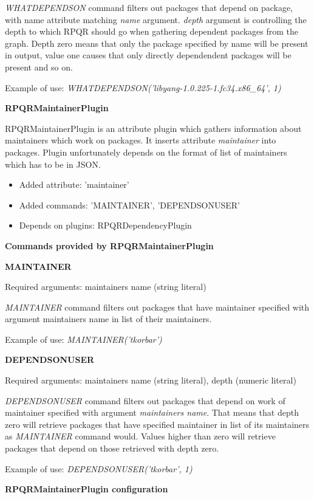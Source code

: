 \textit{WHATDEPENDSON} command filters out packages that depend on package, with name attribute matching
\textit{name} argument. \textit{depth} argument is controlling the depth to which RPQR
should go when gathering dependent packages from the graph. Depth zero means that only the package specified
by name will be present in output, value one causes that only directly dependendent packages will be present and
so on.

Example of use: \textit{WHATDEPENDSON('libyang-1.0.225-1.fc34.x86\_64', 1)}

\textbf{RPQRMaintainerPlugin}

RPQRMaintainerPlugin is an attribute plugin which gathers information about maintainers which work
on packages. It inserts attribute \textit{maintainer} into packages. Plugin unfortunately depends
on the format of list of maintainers which has to be in JSON.

\begin{itemize}
  \item Added attribute: 'maintainer'
  \item Added commands: 'MAINTAINER', 'DEPENDSONUSER'
  \item Depends on plugins: RPQRDependencyPlugin
\end{itemize}

\textbf{Commands provided by RPQRMaintainerPlugin}

\textbf{MAINTAINER}

Required arguments: maintainers name (string literal)

\textit{MAINTAINER} command filters out packages that have maintainer specified with argument
maintainers name in list of their maintainers.

Example of use: \textit{MAINTAINER('tkorbar')}

\textbf{DEPENDSONUSER}

Required arguments: maintainers name (string literal), depth (numeric literal)

\textit{DEPENDSONUSER} command filters out packages that depend on work of maintainer specified with
argument \textit{maintainers name}. That means that depth zero will retrieve packages that have specified
maintainer in list of its maintainers as \textit{MAINTAINER} command would. Values higher than zero
will retrieve packages that depend on those retrieved with depth zero.

Example of use: \textit{DEPENDSONUSER('tkorbar', 1)}

\textbf{RPQRMaintainerPlugin configuration}


